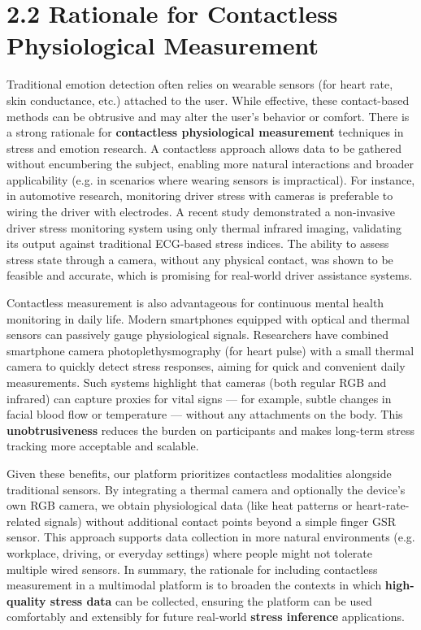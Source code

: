 \documentclass[11pt,a4paper]{report}
\begin{document}
\section{2.2 Rationale for Contactless Physiological Measurement}

Traditional emotion detection often relies on wearable sensors (for
heart rate, skin conductance, etc.) attached to the user. While
effective, these contact-based methods can be obtrusive and may alter
the user's behavior or comfort. There is a strong rationale for
\textbf{contactless physiological measurement} techniques in stress and
emotion research. A contactless approach allows data to be gathered
without encumbering the subject, enabling more natural interactions and
broader applicability (e.g. in scenarios where wearing sensors is
impractical). For instance, in automotive research, monitoring driver
stress with cameras is preferable to wiring the driver with electrodes.
A recent study demonstrated a non-invasive driver stress monitoring
system using only thermal infrared imaging, validating its output
against traditional ECG-based stress
indices\cite{DriverStressThermal2020}.
The ability to assess stress state through a camera, without any
physical contact, was shown to be feasible and accurate, which is
promising for real-world driver assistance systems.

Contactless measurement is also advantageous for continuous mental
health monitoring in daily life. Modern smartphones equipped with
optical and thermal sensors can passively gauge physiological signals.
Researchers have combined smartphone camera photoplethysmography (for
heart pulse) with a small thermal camera to quickly detect stress
responses, aiming for quick and convenient daily
measurements\cite{GSRFacialThermal2021}.
Such systems highlight that cameras (both regular RGB and infrared) can
capture proxies for vital signs --- for example, subtle changes in facial
blood flow or temperature --- without any attachments on the body. This
\textbf{unobtrusiveness} reduces the burden on participants and makes
long-term stress tracking more acceptable and scalable.

Given these benefits, our platform prioritizes contactless modalities
alongside traditional sensors. By integrating a thermal camera and
optionally the device's own RGB camera, we obtain physiological data
(like heat patterns or heart-rate-related signals) without additional
contact points beyond a simple finger GSR sensor. This approach supports
data collection in more natural environments (e.g. workplace, driving,
or everyday settings) where people might not tolerate multiple wired
sensors. In summary, the rationale for including contactless measurement
in a multimodal platform is to broaden the contexts in which
\textbf{high-quality stress data} can be collected, ensuring the platform can
be used comfortably and extensibly for future real-world \textbf{stress
inference} applications.
\end{document}
